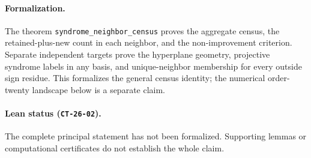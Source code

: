 \paragraph{Formalization.} The theorem \texttt{syndrome\_\allowbreak neighbor\_\allowbreak census} proves the aggregate census, the retained-plus-new count in each neighbor, and the non-improvement criterion. Separate independent targets prove the hyperplane geometry, projective syndrome labels in any basis, and unique-neighbor membership for every outside sign residue. This formalizes the general census identity; the numerical order-twenty landscape below is a separate claim.

\paragraph{Lean status (\texttt{CT-26-02}).} The complete principal statement has not been formalized. Supporting lemmas or computational certificates do not establish the whole claim.
